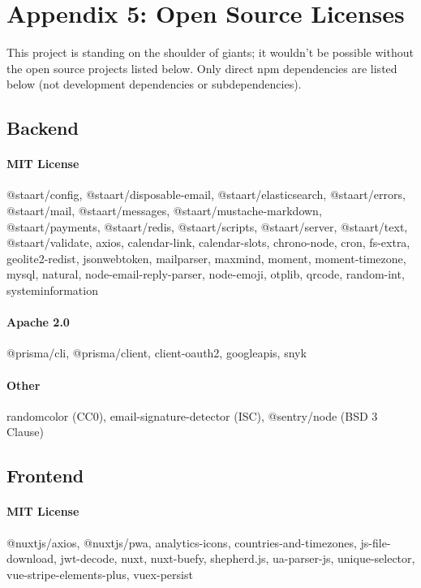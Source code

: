 \documentclass{article}
\begin{document}
\newpage

\section*{Appendix 5: Open Source Licenses}

This project is standing on the shoulder of giants; it wouldn't be possible without the open source projects listed below. Only direct npm dependencies are listed below (not development dependencies or subdependencies).

\subsection*{Backend}

\paragraph{MIT License} @staart/config, @staart/disposable-email, @staart/elasticsearch, @staart/errors, @staart/mail, @staart/messages, @staart/mustache-markdown, @staart/payments, @staart/redis, @staart/scripts, @staart/server, @staart/text, @staart/validate, axios, calendar-link, calendar-slots, chrono-node, cron, fs-extra, geolite2-redist, jsonwebtoken, mailparser, maxmind, moment, moment-timezone, mysql, natural, node-email-reply-parser, node-emoji, otplib, qrcode, random-int, systeminformation

\paragraph{Apache 2.0} @prisma/cli, @prisma/client, client-oauth2, googleapis, snyk

\paragraph{Other} randomcolor (CC0), email-signature-detector (ISC), @sentry/node (BSD 3 Clause)

\subsection*{Frontend}

\paragraph{MIT License} @nuxtjs/axios, @nuxtjs/pwa, analytics-icons, countries-and-timezones, js-file-download, jwt-decode, nuxt, nuxt-buefy, shepherd.js, ua-parser-js, unique-selector, vue-stripe-elements-plus, vuex-persist
\end{document}
